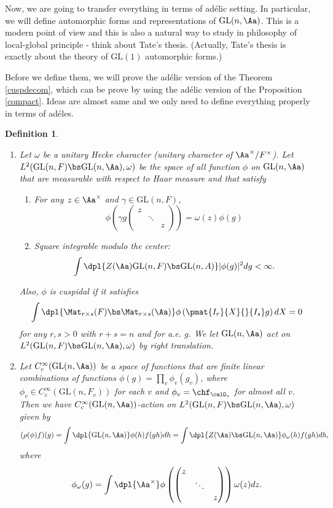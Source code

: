 \documentclass{article}
\newtheorem{definition}{Definition}[section]
\newcommand{\GL}{\mathrm{GL}}
\begin{document}
Now, we are going to transfer everything in terms of ad\'elic setting. In particular, we will define automorphic forms and representations of $\GL(n, \Aa)$. 
This is a modern point of view and this is also a natural way to study in philosophy of local-global principle - think about Tate's thesis. 
(Actually, Tate's thesis is exactly about the theory of $\GL(1)$ automorphic forms.) 

Before we define them, we will prove the ad\'elic version of the Theorem \ref{cuspdecom}, which can be prove by using the ad\'elic version of the Proposition \ref{compact}. 
Ideas are almost same and we only need to define everything properly in terms of ad\'eles. 

\begin{definition}
\label{l2def}
\begin{enumerate}
\item
Let $\omega$ be a unitary Hecke character (unitary character of  $\Aa^{\times}/F^{\times}$). 
Let $L^{2}(\GL(n, F) \bs \GL(n, \Aa), \omega)$ be the space of all function $\phi$ on $\GL(n, \Aa)$ that are measurable with respect to Haar measure and that satisfy
\begin{enumerate}
\item For any $z\in \Aa^{\times}$ and $\gamma \in \GL(n, F)$, 
$$
\phi\left(\gamma g\begin{pmatrix} z & & \\ & \ddots & \\ & & z\end{pmatrix}\right) = \omega(z)\phi(g)
$$
\item Square integrable modulo the center:
$$
\int\dpl{Z(\Aa)\GL(n, F) \bs \GL(n, A)} |\phi(g)|^{2} dg < \infty. 
$$ 
\end{enumerate}
Also, $\phi$ is cuspidal if it satisfies 
$$
\int\dpl{\Mat_{r\times s}(F) \bs \Mat_{r\times s}(\Aa)} \phi\left(\pmat{I_{r}}{X}{}{I_{s}}g\right)dX = 0
$$
for any $r, s>0$ with $r + s = n$ and for a.e. $g$. 
We let $\GL(n, \Aa)$ act on $L^{2}(\GL(n, F)\bs \GL(n, \Aa), \omega)$ by right translation. 
\item Let $C_{c}^{\infty}(\GL(n, \Aa))$ be a space of functions that are finite linear combinations of functions $\phi(g) = \prod_{v} \phi_{v}(g_{v})$, where $\phi_v \in C_{c}^{\infty}(\GL(n, F_{v}))$ for each $v$ and $\phi_v = \chf_{\calO_{v}}$ for almost all $v$. 
Then we have $C_{c}^{\infty}(\GL(n, \Aa))$-action on $L^{2}(\GL(n, F)\bs \GL(n, \Aa), \omega)$ given by 
$$
(\rho(\phi)f)(g) = \int\dpl{\GL(n, \Aa)} \phi(h)f(gh)dh = \int\dpl{Z(\Aa)\bs \GL(n, \Aa)} \phi_{\omega}(h) f(gh)dh, 
$$
where
$$
\phi_{\omega}(g) = \int\dpl{\Aa^{\times}} \phi \left(\begin{pmatrix}z & & \\ & \ddots & \\ & & z \end{pmatrix}\right)\omega(z)dz.
$$
\end{enumerate}
\end{definition}
\end{document}
